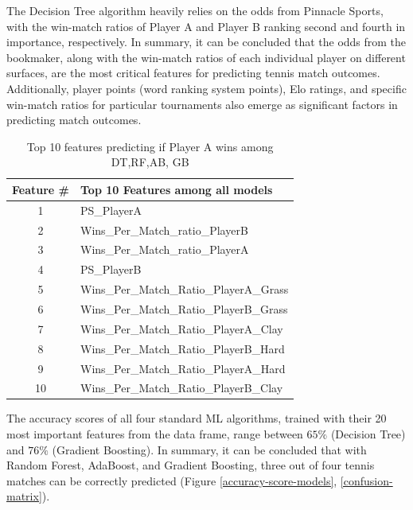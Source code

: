 \documentclass[preprint,aps,nofootinbib,a4paper,superscriptaddress,longbibliography,amsfonts,amssymb,amsmath,titlepage]{revtex4-2}
\begin{document}
%
The Decision Tree algorithm heavily relies on the odds from Pinnacle Sports, with the win-match ratios of Player A and Player B ranking second and fourth in importance, respectively.
In summary, it can be concluded that the odds from the bookmaker, along with the win-match ratios of each individual player on different surfaces, are the most critical features for predicting tennis match outcomes. Additionally, player points (word ranking system points), Elo ratings, and specific win-match ratios for particular tournaments also emerge as significant factors in predicting match outcomes.

\begin{table}[h]
\centering
\caption{Top 10 features predicting if Player A wins among DT,RF,AB, GB}
\begin{tabular}{|c|l|}
\hline
\textbf{Feature \#} & \textbf{Top 10 Features among all models} \\
\hline
1 & PS\_PlayerA \\
2 & Wins\_Per\_Match\_ratio\_PlayerB \\
3 & Wins\_Per\_Match\_ratio\_PlayerA \\
4 & PS\_PlayerB \\
5 & Wins\_Per\_Match\_Ratio\_PlayerA\_Grass \\
6 & Wins\_Per\_Match\_Ratio\_PlayerB\_Grass \\
7 & Wins\_Per\_Match\_Ratio\_PlayerA\_Clay \\
8 & Wins\_Per\_Match\_Ratio\_PlayerB\_Hard \\
9 & Wins\_Per\_Match\_Ratio\_PlayerA\_Hard \\
10 & Wins\_Per\_Match\_Ratio\_PlayerB\_Clay \\
\hline
\end{tabular}
\label{top-10-features-table}
\end{table}

The accuracy scores of all four standard ML algorithms, trained with their 20 most important features from the data frame, range between $65 \%$ (Decision Tree) and $76 \%$ (Gradient Boosting). In summary, it can be concluded that with Random Forest, AdaBoost, and Gradient Boosting, three out of four tennis matches can be correctly predicted (Figure \ref{accuracy-score-models}, \ref{confusion-matrix}).
\end{document}
